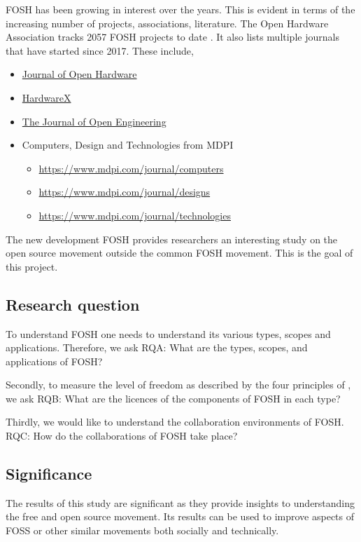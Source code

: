 \documentclass[final-report.tex]{subfiles}
\begin{document}
FOSH has been growing in interest over the years. 
This is evident in terms of the increasing number of projects, associations, literature. 
The Open Hardware Association tracks 
2057 
FOSH projects to date \cite{OSH_association_def}.
It also lists multiple journals that have started since 2017.
These include, 
\begin{itemize}
    \item \href{https://openhardware.metajnl.com/}{Journal of Open Hardware}
    \item \href{https://www.sciencedirect.com/journal/hardwarex}{HardwareX}
    \item \href{https://www.tjoe.org/}{The Journal of Open Engineering}
    \item Computers, Design and Technologies from MDPI
        \begin{itemize}
            \item \href{Computers}{https://www.mdpi.com/journal/computers}
            \item \href{Designs}{https://www.mdpi.com/journal/designs}
            \item \href{Technologies}{https://www.mdpi.com/journal/technologies}
        \end{itemize}
\end{itemize}

The new development FOSH provides researchers an interesting study on the open source movement outside the common FOSH movement. 
This is the goal of this project. 

\subsection{Research question}

To understand FOSH one needs to understand its various types, scopes and applications.
Therefore, we ask
    RQA: What are the types, scopes, and applications of FOSH?

Secondly, to measure the level of freedom as described by the four principles of \cite{b0_stallman}, we ask
    RQB: What are the licences of the components of FOSH in each type?

Thirdly, we would like to understand the collaboration environments of FOSH.
    RQC: How do the collaborations of FOSH take place?

\subsection{Significance}
The results of this study are significant as they provide insights to understanding the free and open source movement. 
Its results can be used to improve aspects of FOSS or other similar movements both socially and technically. 
\end{document}
